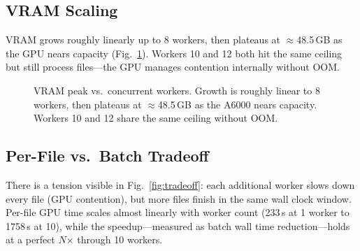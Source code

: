 \documentclass[conference,10pt]{IEEEtran}
\begin{document}
\subsection{VRAM Scaling}

VRAM grows roughly linearly up to 8 workers, then plateaus at
$\approx$48.5\,GB as the GPU nears capacity (Fig.~\ref{fig:vramscaling}).
Workers 10 and 12 both hit the same ceiling but still process files---the GPU
manages contention internally without OOM.

\begin{figure}[!t]
\centering
{}
\caption{VRAM peak vs.\ concurrent workers. Growth is roughly linear to 8
  workers, then plateaus at $\approx$48.5\,GB as the A6000 nears capacity.
  Workers 10 and 12 share the same ceiling without OOM.}
\label{fig:vramscaling}
\end{figure}

\subsection{Per-File vs.\ Batch Tradeoff}

There is a tension visible in Fig.~\ref{fig:tradeoff}: each additional worker
slows down every file (GPU contention), but more files finish in the same wall
clock window. Per-file GPU time scales almost linearly with worker count
(233\,s at 1 worker to 1758\,s at 10), while the speedup---measured as batch
wall time reduction---holds at a perfect $N$$\times$ through 10 workers.
\end{document}
